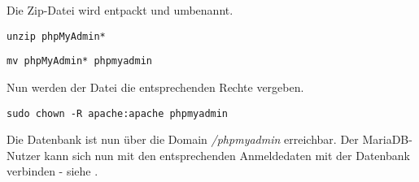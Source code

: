 Die Zip-Datei wird entpackt und umbenannt.

\texttt{unzip phpMyAdmin*}

\texttt{mv phpMyAdmin* phpmyadmin}

Nun werden der Datei die entsprechenden Rechte vergeben.

\texttt{sudo chown -R apache:apache phpmyadmin}

Die Datenbank ist nun über die Domain \textit{/phpmyadmin} erreichbar.
Der MariaDB-Nutzer kann sich nun mit den entsprechenden Anmeldedaten mit der Datenbank verbinden - siehe .

